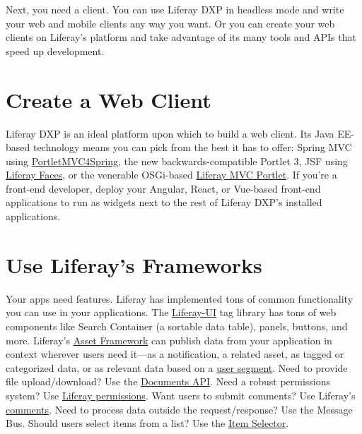 Next, you need a client. You can use Liferay DXP in headless mode and
write your web and mobile clients any way you want. Or you can create
your web clients on Liferay's platform and take advantage of its many
tools and APIs that speed up development.

\section{Create a Web Client}\label{create-a-web-client}

Liferay DXP is an ideal platform upon which to build a web client. Its
Java EE-based technology means you can pick from the best it has to
offer: Spring MVC using
\href{https://github.com/liferay/portletmvc4spring}{PortletMVC4Spring},
the new backwards-compatible Portlet 3, JSF using
\href{https://liferayfaces.org}{Liferay Faces}, or the venerable
OSGi-based
\href{/docs/7-2/appdev/-/knowledge_base/a/liferay-mvc-portlet}{Liferay
MVC Portlet}. If you're a front-end developer, deploy your Angular,
React, or Vue-based front-end applications to run as widgets next to the
rest of Liferay DXP's installed applications.

\section{Use Liferay's Frameworks}\label{use-liferays-frameworks}

Your apps need features. Liferay has implemented tons of common
functionality you can use in your applications. The
\href{https://docs.liferay.com/dxp/portal/7.2-latest/taglibs/util-taglib/liferay-ui/tld-summary.html}{Liferay-UI}
tag library has tons of web components like Search Container (a sortable
data table), panels, buttons, and more. Liferay's
\href{/docs/7-2/frameworks/-/knowledge_base/f/asset-framework}{Asset
Framework} can publish data from your application in context wherever
users need it---as a notification, a related asset, as tagged or
categorized data, or as relevant data based on a
\href{/docs/7-2/user/-/knowledge_base/u/creating-user-segments}{user
segment}. Need to provide file upload/download? Use the
\href{/docs/7-2/frameworks/-/knowledge_base/f/documents-and-media-api}{Documents
API}. Need a robust permissions system? Use
\href{/docs/7-2/frameworks/-/knowledge_base/f/defining-application-permissions}{Liferay
permissions}. Want users to submit comments? Use Liferay's
\href{/docs/7-2/frameworks/-/knowledge_base/f/adding-comments-to-your-app}{comments}.
Need to process data outside the request/response? Use the Message Bus.
Should users select items from a list? Use the
\href{/docs/7-2/frameworks/-/knowledge_base/f/item-selector}{Item
Selector}.

